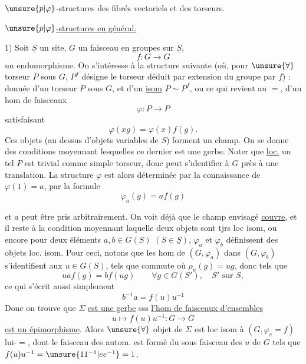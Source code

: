 
$\unsure{p|\varphi}$-structures des
fibrés vectoriels et
des torseurs.


\uline{$\unsure{p|\varphi}$-structures en général.}

1) Soit $\underline S$ un site, $G$ un faisceau en groupes sur $\underline S$,
\[
f:G\longrightarrow G
\]
un endomorphisme. On s'intéresse à la structure
suivante (où, pour $\unsure{\forall}$ torseur $P$ sous $G$,
$P^f$ désigne le torseur déduit par extension du
groupe par $f$) : donnée d'un torseur $P$
sous $G$, et d'un \uline{isom} $P\sim P^f$, ou ce qui
revient au $=$, d'un hom de faisceaux
\[
\varphi:P\longrightarrow P
\]
satisfaisant
\[
\varphi(xg)=\varphi(x)f(g).
\]
Ces objets (au dessus d'objets variables de $S$)
forment un champ.
On se donne des conditions
moyennant lesquelles ce dernier est une gerbe.
Noter que \uline{loc.} un tel $P$ est trivial comme
simple torseur, donc peut s'identifier à $G$ près
à une translation. La structure $\varphi$ est alors
déterminée par la connaissance de $\varphi(1)=a$,
par la formule
\[
\varphi_a(g)=a f(g)
\]

et $a$ peut être pris arbitrairement. On voit déjà
que le champ envisagé \uline{couvre}, et il reste
à  la condition moyennant laquelle deux
objets sont tjrs loc isom, ou encore
pour deux éléments $a,b\in G(S)$ $(S\in\underline S)$,
$\varphi_a$ et $\varphi_b$ définissent des objets loc. isom.
Pour ceci, notons que les hom de
$(G,\varphi_a)$ dans $(G,\varphi_b)$ s'identifient aux $u\in G(S)$,
tels que
commute
où $\rho_u(g)=ug$, donc tels que
\[
u a f(g)=b f(ug)\qquad \forall g\in G(S'),\quad S'\text{ sur }S,
\]
ce qui s'écrit aussi simplement
\[
b^{-1}a=f(u)u^{-1}
\]
Donc on trouve que $\Sigma$ \uline{est une gerbe} sss
\uline{l'hom de faisceaux d'ensembles}
\[
u\longmapsto f(u)u^{-1}:G\longrightarrow G
\]
\uline{est un épimorphisme}. Alors $\unsure{\forall}$ objet de
$\Sigma$ est loc isom à $(G,\varphi_e=f)$ lui-$=$,
dont le faisceau des autom. est formé du
sous faisceau des $u$ de $G$ tels que $f(u)u^{-1}=\unsure{11^{-1}|ee^{-1}}=1$,

